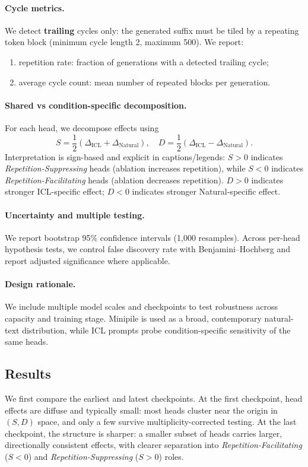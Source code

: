 \documentclass[11pt]{article}
\begin{document}
\paragraph{Cycle metrics.}
We detect \textbf{trailing} cycles only: the generated suffix must be tiled by a repeating token block (minimum cycle length 2, maximum 500). We report:
\begin{enumerate}[leftmargin=*]
    \item repetition rate: fraction of generations with a detected trailing cycle;
    \item average cycle count: mean number of repeated blocks per generation.
\end{enumerate}

\paragraph{Shared vs condition-specific decomposition.}
For each head, we decompose effects using
\begin{equation}
S = \frac{1}{2}(\Delta_{\mathrm{ICL}} + \Delta_{\mathrm{Natural}}), \quad
D = \frac{1}{2}(\Delta_{\mathrm{ICL}} - \Delta_{\mathrm{Natural}}).
\end{equation}
Interpretation is sign-based and explicit in captions/legends: $S>0$ indicates \textit{Repetition-Suppressing} heads (ablation increases repetition), while $S<0$ indicates \textit{Repetition-Facilitating} heads (ablation decreases repetition). $D>0$ indicates stronger ICL-specific effect; $D<0$ indicates stronger Natural-specific effect.

\paragraph{Uncertainty and multiple testing.}
We report bootstrap 95\% confidence intervals (1,000 resamples). Across per-head hypothesis tests, we control false discovery rate with Benjamini--Hochberg and report adjusted significance where applicable.

\paragraph{Design rationale.}
We include multiple model scales and checkpoints to test robustness across capacity and training stage. Minipile is used as a broad, contemporary natural-text distribution, while ICL prompts probe condition-specific sensitivity of the same heads.

\subsection{Results}
We first compare the earliest and latest checkpoints. At the first checkpoint, head effects are diffuse and typically small: most heads cluster near the origin in $(S,D)$ space, and only a few survive multiplicity-corrected testing. At the last checkpoint, the structure is sharper: a smaller subset of heads carries larger, directionally consistent effects, with clearer separation into \textit{Repetition-Facilitating} ($S<0$) and \textit{Repetition-Suppressing} ($S>0$) roles.
\end{document}
